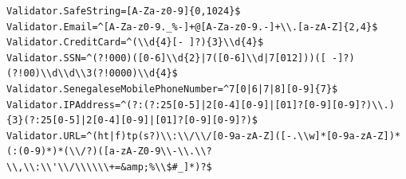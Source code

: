 \begin{lstlisting}
Validator.SafeString=[A-Za-z0-9]{0,1024}$
Validator.Email=^[A-Za-z0-9._%-]+@[A-Za-z0-9.-]+\\.[a-zA-Z]{2,4}$
Validator.CreditCard=^(\\d{4}[- ]?){3}\\d{4}$
Validator.SSN=^(?!000)([0-6]\\d{2}|7([0-6]\\d|7[012]))([ -]?)(?!00)\\d\\d\\3(?!0000)\\d{4}$
Validator.SenegaleseMobilePhoneNumber=^7[0|6|7|8][0-9]{7}$
Validator.IPAddress=^(?:(?:25[0-5]|2[0-4][0-9]|[01]?[0-9][0-9]?)\\.){3}(?:25[0-5]|2[0-4][0-9]|[01]?[0-9][0-9]?)$
Validator.URL=^(ht|f)tp(s?)\\:\\/\\/[0-9a-zA-Z]([-.\\w]*[0-9a-zA-Z])*(:(0-9)*)*(\\/?)([a-zA-Z0-9\\-\\.\\?\\,\\:\\'\\/\\\\\\+=&amp;%\\$#_]*)?$
\end{lstlisting}
